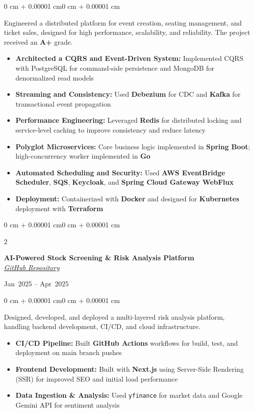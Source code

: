 \documentclass[10pt, letterpaper]{article}
\let\oldhref\href
\renewcommand{\href}[2]{\oldhref{#1}{\textit{\underline{#2}}}}
\newenvironment{highlights}{
    \begin{itemize}[
        topsep=0.10 cm,
        parsep=0.10 cm,
        partopsep=0pt,
        itemsep=0pt,
        leftmargin=0 cm + 10pt
    ]
}{
    \end{itemize}
}
\newenvironment{onecolentry}{
    \begin{adjustwidth}{0 cm + 0.00001 cm}{0 cm + 0.00001 cm}
}{
    \end{adjustwidth}
}
\newenvironment{twocolentry}[2][]{
    \onecolentry
    \def\secondColumn{#2}
    \setcolumnwidth{\fill, 4.5 cm}
    \begin{paracol}{2}
}{
    \switchcolumn \raggedleft \secondColumn
    \end{paracol}
    \endonecolentry
}
\begin{document}
    \begin{onecolentry}
        Engineered a distributed platform for event creation, seating management, and ticket sales, designed for high performance, scalability, and reliability. The project received an \textbf{A+} grade.
        \begin{highlights}
            \item \textbf{Architected a CQRS and Event-Driven System:} Implemented CQRS with PostgreSQL for command-side persistence and MongoDB for denormalized read models
            \item \textbf{Streaming and Consistency:} Used \textbf{Debezium} for CDC and \textbf{Kafka} for transactional event propagation
            \item \textbf{Performance Engineering:} Leveraged \textbf{Redis} for distributed locking and service-level caching to improve consistency and reduce latency
            \item \textbf{Polyglot Microservices:} Core business logic implemented in \textbf{Spring Boot}; high-concurrency worker implemented in \textbf{Go}
            \item \textbf{Automated Scheduling and Security:} Used \textbf{AWS EventBridge Scheduler}, \textbf{SQS}, \textbf{Keycloak}, and \textbf{Spring Cloud Gateway WebFlux}
            \item \textbf{Deployment:} Containerized with \textbf{Docker} and designed for \textbf{Kubernetes} deployment with \textbf{Terraform}
        \end{highlights}
    \end{onecolentry}

    \vspace{0.2 cm}

    \begin{twocolentry}{
        Jan~2025 -- Apr~2025
    }
        \textbf{AI-Powered Stock Screening \& Risk Analysis Platform} \\
        \href{https://github.com/Intelligent-Advisor-Sem-4}{GitHub Repository}
    \end{twocolentry}

    \vspace{0.10 cm}

    \begin{onecolentry}
        Designed, developed, and deployed a multi-layered risk analysis platform, handling backend development, CI/CD, and cloud infrastructure.
        \begin{highlights}
            \item \textbf{CI/CD Pipeline:} Built \textbf{GitHub Actions} workflows for build, test, and deployment on main branch pushes
            \item \textbf{Frontend Development:} Built with \textbf{Next.js} using Server-Side Rendering (SSR) for improved SEO and initial load performance
            \item \textbf{Data Ingestion \& Analysis:} Used \texttt{yfinance} for market data and Google Gemini API for sentiment analysis
        \end{highlights}
    \end{onecolentry}
\end{document}
